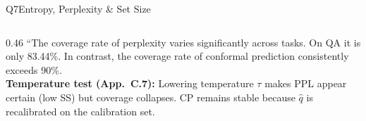 \documentclass[aspectratio=169,10pt]{beamer}
\begin{document}
\begin{frame}{Q7\enspace Entropy, Perplexity \& Set Size}
\begin{columns}[T]
\begin{column}{0.46\textwidth}
    \vspace{0.5em}
    {\footnotesize\color{Slate}
      ``The coverage rate of perplexity varies significantly across tasks. On QA it is only 83.44\%.
      In contrast, the coverage rate of conformal prediction consistently exceeds 90\%.\\[5pt]
      \textbf{Temperature test (App.\ C.7):} Lowering temperature $\tau$ makes PPL appear certain (low SS) but coverage collapses.
      CP remains stable because $\hat{q}$ is recalibrated on the calibration set.}


  \end{column}
\end{columns}
\end{frame}

\end{document}
